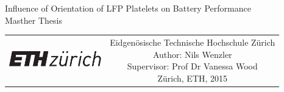 \begin{titlepage}
\sffamily


\null\vspace{2cm}

{\huge Influence of Orientation of LFP Platelets on Battery Performance  \\[12pt] Masther Thesis} \\[24pt] 
    
\vfill

\begin{tabular} {cc}
\parbox{0.3\textwidth}{\includegraphics[width=4cm]{figures/eth_logo_kurz_pos}}
&
\parbox{0.7\textwidth}{%
	Eidgen\"osische Technische Hochschule Z\"urich\\[6pt]
	Author: Nils Wenzler\\[9pt]
%
\small
%
    Supervisor: Prof Dr Vanessa Wood\\[12pt]
%
Z\"urich, ETH, 2015}
\end{tabular}
\vspace{2cm}
\end{titlepage}



